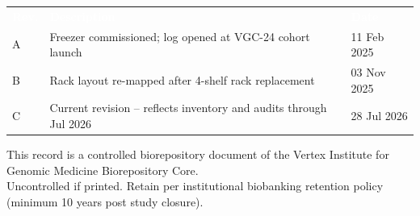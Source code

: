 {\begin{titlepage}
\begin{center}
\begin{minipage}{0.95\linewidth}
\small
\renewcommand{\arraystretch}{1.2}
\begin{tabularx}{\linewidth}{@{}l X l@{}}
\rowcolor{freezerblue}
\textcolor{white}{\textbf{Rev.}} & \textcolor{white}{\textbf{Description}} & \textcolor{white}{\textbf{Date}} \\
A & Freezer commissioned; log opened at VGC-24 cohort launch & 11 Feb 2025 \\
B & Rack layout re-mapped after 4-shelf rack replacement & 03 Nov 2025 \\
C & Current revision -- reflects inventory and audits through Jul 2026 & 28 Jul 2026 \\
\end{tabularx}
\end{minipage}
\end{center}
\par

\vfill

\begin{center}
{\scriptsize\color{freezerblue} This record is a controlled biorepository document of the Vertex Institute for Genomic Medicine Biorepository Core. \\
Uncontrolled if printed. Retain per institutional biobanking retention policy (minimum 10 years post study closure).}
\end{center}

\end{titlepage}
}
